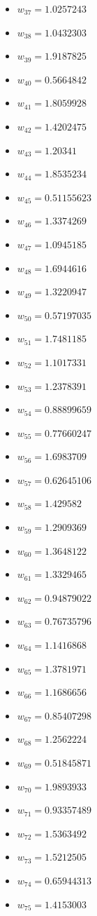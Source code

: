 \documentclass[11pt]{article}
\begin{document}
\begin{itemize}
\item $w_{37} = 1.0257243$
\item $w_{38} = 1.0432303$
\item $w_{39} = 1.9187825$
\item $w_{40} = 0.5664842$
\item $w_{41} = 1.8059928$
\item $w_{42} = 1.4202475$
\item $w_{43} = 1.20341$
\item $w_{44} = 1.8535234$
\item $w_{45} = 0.51155623$
\item $w_{46} = 1.3374269$
\item $w_{47} = 1.0945185$
\item $w_{48} = 1.6944616$
\item $w_{49} = 1.3220947$
\item $w_{50} = 0.57197035$
\item $w_{51} = 1.7481185$
\item $w_{52} = 1.1017331$
\item $w_{53} = 1.2378391$
\item $w_{54} = 0.88899659$
\item $w_{55} = 0.77660247$
\item $w_{56} = 1.6983709$
\item $w_{57} = 0.62645106$
\item $w_{58} = 1.429582$
\item $w_{59} = 1.2909369$
\item $w_{60} = 1.3648122$
\item $w_{61} = 1.3329465$
\item $w_{62} = 0.94879022$
\item $w_{63} = 0.76735796$
\item $w_{64} = 1.1416868$
\item $w_{65} = 1.3781971$
\item $w_{66} = 1.1686656$
\item $w_{67} = 0.85407298$
\item $w_{68} = 1.2562224$
\item $w_{69} = 0.51845871$
\item $w_{70} = 1.9893933$
\item $w_{71} = 0.93357489$
\item $w_{72} = 1.5363492$
\item $w_{73} = 1.5212505$
\item $w_{74} = 0.65944313$
\item $w_{75} = 1.4153003$

\end{itemize}
\end{document}
